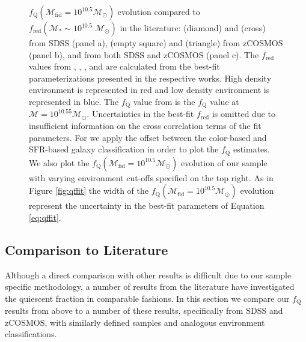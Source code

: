 \documentclass{emulateapj}
\begin{document}
\def \iovinopanel {b}
\def \kovacpanel {b}
\def \pengpanel {c}
\begin{figure}
    \begin{center}
        \leavevmode
        \caption{$f_{\mathrm{Q}}(\mathcal{M}_{\mathrm{fid}}=10^{10.5} \mathcal{M}_\odot)$ evolution compared to $f_{\mathrm{red}}(\mathcal{M}_{*} \sim 10^{10.5} \; \mathcal{M}_{\odot})$ in the literature: \cite{Baldry:2006aa} (diamond) and \cite{geha12a} (cross) from SDSS (panel a), \cite{Iovino:2010aa} (empty square) and \cite{Kovac:2014aa} (triangle) from zCOSMOS (panel \kovacpanel), and \cite{Peng:2010aa} from both SDSS and zCOSMOS (panel \pengpanel). The $f_{\mathrm{red}}$ values from \cite{Iovino:2010aa}, \cite{Kovac:2014aa}, \cite{Baldry:2006aa}, and \cite{Peng:2010aa} are calculated from the best-fit parameterizations presented in the respective works. High density environment is represented in red and low density environment is represented in blue. The $f_{\mathrm{Q}}$ value from \cite{geha12a} is the $f_{\mathrm{Q}}$ value at $\mathcal{M} = 10^{10.55} \mathcal{M}_{\odot}$. Uncertainties in the \cite{Iovino:2010aa} best-fit $f_{\mathrm{red}}$ is omitted due to insufficient information on the cross correlation terms of the fit parameters. For \cite{Kovac:2014aa} we apply the offset between the color-based and SFR-based galaxy classification in order to plot the $f_{\mathrm{Q}}$ estimates. We also plot the $f_{\mathrm{Q}}(\mathcal{M}_{\mathrm{fid}} = 10^{10.5} \mathcal{M}_\odot)$ evolution of our sample with varying environment cut-offs specified on the top right. As in Figure \ref{fig:qffit} the width of the $f_{\mathrm{Q}}(\mathcal{M}_{\mathrm{fid}} = 10^{10.5} \mathcal{M}_\odot)$ evolution represent the uncertainty in the best-fit parameters of Equation \ref{eq:qffit}.}         \label{fig:qffit_comp}
    \end{center}
\end{figure}

\subsection{Comparison to Literature}
Although a direct comparison with other results is difficult due to
our sample specific methodology, a number of results from the literature have investigated the quiescent fraction in comparable fashions. In this section we compare our $f_{\mathrm{Q}}$ results from above to a number of these results, specifically from SDSS and zCOSMOS, with similarly defined samples and analogous environment classifications. 
\end{document}
